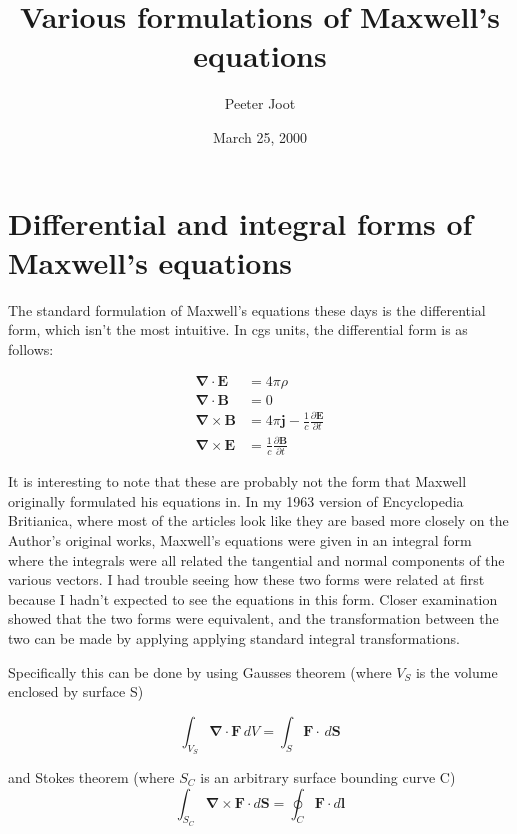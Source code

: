 \documentclass{article}      %
\title{Various formulations of Maxwell's equations} %
\author{Peeter Joot}         %
\date{March 25, 2000}        %
\newcommand{\grad}[0]{\boldsymbol{\nabla}}
\newcommand{\curl}[0]{\grad \times}
\newcommand{\diverg}[0]{\grad \cdot}
\newcommand{\D}[2] {\frac {\partial #2} {\partial #1}}
\newcommand{\Bj}[0]{\mathbf{j}}
\newcommand{\BB}[0]{\mathbf{B}}
\newcommand{\BE}[0]{\mathbf{E}}
\newcommand{\BF}[0]{\mathbf{F}}
\newcommand{\BS}[0]{\mathbf{S}}
\begin{document}


\section{Differential and integral forms of Maxwell's equations}

The standard formulation of Maxwell's equations these days is the differential
form, which isn't the most intuitive.  In cgs units, the differential
form is as follows:

\begin{align*}
\diverg \BE &= 4\pi\rho \\
\diverg \BB &= 0 \\
\curl \BB &= 4\pi \Bj - \frac{1}{c} \D{t}{\BE} \\
\curl \BE &= \frac{1}{c} \D{t}{\BB}
\end{align*}

It is interesting to note that these are probably not the form that Maxwell 
originally formulated his equations in.  In my 1963 version of Encyclopedia 
Britianica, where most of the articles look like they are based more closely on the Author's
original works, Maxwell's equations were given in an integral form where the 
integrals were all related the tangential and normal components of the various vectors.  I had 
trouble seeing how these two forms were related at first because I hadn't expected to 
see the equations in this form.  Closer examination showed that the two forms 
were equivalent, and the transformation between the two can be made by applying 
applying standard integral transformations.

Specifically this can be done by using Gausses theorem (where $V_S$ is the volume enclosed by surface S)

\begin{equation*}
\int_{V_S} \diverg \BF\,dV =
\int_S \mathbf{F} \cdot\, d\BS 
\end{equation*}

and Stokes theorem (where $S_C$ is an arbitrary surface bounding curve C)
\begin{equation*}
\int_{S_C} \curl \BF \cdot d\BS = \oint_C \mathbf{F} \cdot d\mathbf{l}
\end{equation*}
\end{document}

